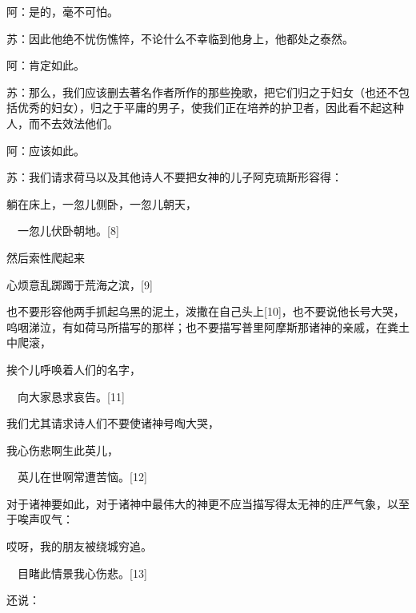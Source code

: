 \documentclass[12pt,oneside]{book}
\begin{document}
阿：是的，毫不可怕。

苏：因此他绝不忧伤憔悴，不论什么不幸临到他身上，他都处之泰然。

阿：肯定如此。

苏：那么，我们应该删去著名作者所作的那些挽歌，把它们归之于妇女（也还不包括优秀的妇女），归之于平庸的男子，使我们正在培养的护卫者，因此看不起这种人，而不去效法他们。

阿：应该如此。

苏：我们请求荷马以及其他诗人不要把女神的儿子阿克琉斯形容得：





躺在床上，一忽儿侧卧，一忽儿朝天，

　一忽儿伏卧朝地。[8]





然后索性爬起来





心烦意乱踯躅于荒海之滨，[9]





也不要形容他两手抓起乌黑的泥土，泼撒在自己头上[10]，也不要说他长号大哭，呜咽涕泣，有如荷马所描写的那样；也不要描写普里阿摩斯那诸神的亲戚，在粪土中爬滚，





挨个儿呼唤着人们的名字，

　向大家恳求哀告。[11]





我们尤其请求诗人们不要使诸神号啕大哭，





我心伤悲啊生此英儿，

　英儿在世啊常遭苦恼。[12]





对于诸神要如此，对于诸神中最伟大的神更不应当描写得太无神的庄严气象，以至于唉声叹气：





哎呀，我的朋友被绕城穷追。

　目睹此情景我心伤悲。[13]





还说：
\end{document}
